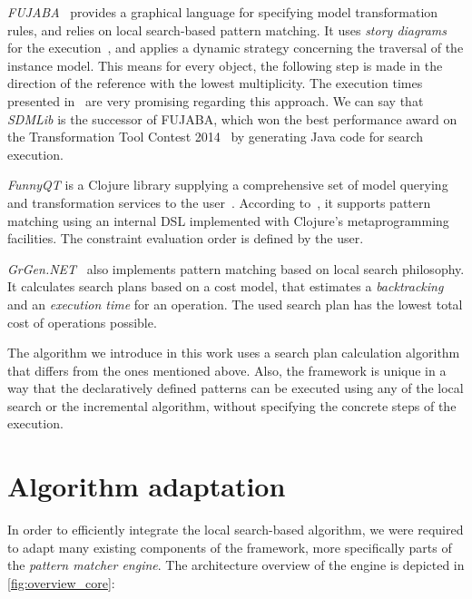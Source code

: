 \emph{FUJABA}~\cite{DBLP:conf/icse/NickelNZ00} provides a graphical language for specifying model transformation rules, and relies on local search-based pattern matching. It uses \emph{story diagrams} for the execution~\cite{DBLP:journals/eceasst/GieseHS09}, and applies a dynamic strategy concerning the traversal of the instance model. This means for every object, the following step is made in the direction of the reference with the lowest multiplicity. The execution times presented in~\cite{DBLP:journals/eceasst/GieseHS09} are very promising regarding this approach. We can say that \emph{SDMLib} is the successor of FUJABA, which won the best performance award on the Transformation Tool Contest 2014~\cite{DBLP:conf/staf/EickhoffGLZ14} by generating Java code for search execution.

\emph{FunnyQT} is a Clojure library supplying a comprehensive set
of model querying and transformation services to the user~\cite{DBLP:conf/gg/Horn15}. According to~\cite{DBLP:conf/icmt/Horn13}, it supports pattern matching using an internal DSL implemented with Clojure’s metaprogramming facilities. The constraint evaluation order is defined by the user. 

\emph{GrGen.NET}~\cite{DBLP:conf/agtive/BatzKG07} also implements pattern matching based on local search philosophy. It calculates search plans based on a cost model, that estimates a \emph{backtracking} and an \emph{execution time} for an operation. The used search plan has the lowest total cost of operations possible. 

The algorithm we introduce in this work uses a search plan calculation algorithm that differs from the ones mentioned above. Also, the \eiq framework is unique in a way that the declaratively defined patterns can be executed using any of the local search or the incremental algorithm, without specifying the concrete steps of the execution.


\section{Algorithm adaptation}
\label{sec:algorithm-adaptation}

In order to efficiently integrate the local search-based algorithm, we were required to adapt many existing components of the \eiq framework, more specifically parts of the \emph{pattern matcher engine}. The architecture overview of the engine is depicted in \autoref{fig:overview_core}:

